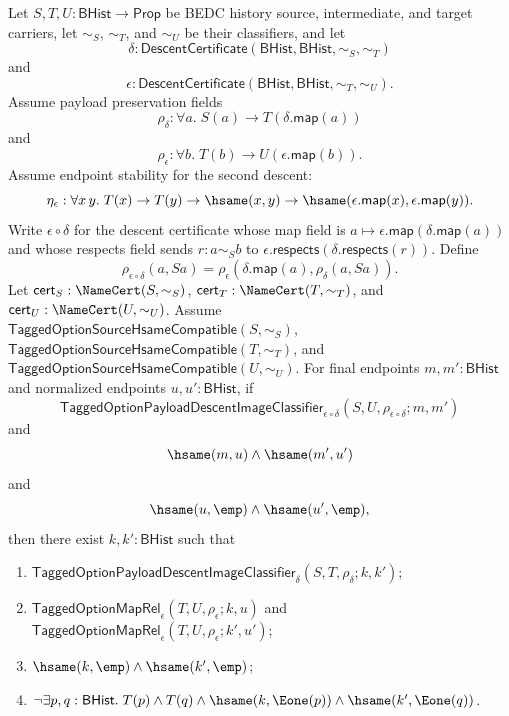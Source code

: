 \begin{theorem}
Let $S,T,U:\mathsf{BHist}\to\mathsf{Prop}$ be BEDC history source,
intermediate, and target carriers, let $\sim_S$, $\sim_T$, and $\sim_U$ be their
classifiers, and let
$$
\delta:\mathsf{DescentCertificate}(\mathsf{BHist},\mathsf{BHist},\sim_S,\sim_T)
$$
and
$$
\epsilon:\mathsf{DescentCertificate}(\mathsf{BHist},\mathsf{BHist},\sim_T,\sim_U).
$$
Assume payload preservation fields
$$
\rho_{\delta}:\forall a.\;S(a)\to T(\delta.\mathsf{map}(a))
$$
and
$$
\rho_{\epsilon}:\forall b.\;T(b)\to U(\epsilon.\mathsf{map}(b)).
$$
Assume endpoint stability for the second descent:
$$
\eta_{\epsilon}:\forall x\,y.\;
T(x)\to T(y)\to \hsame(x,y)\to
\hsame(\epsilon.\mathsf{map}(x),\epsilon.\mathsf{map}(y)).
$$
Write $\epsilon\circ\delta$ for the descent certificate whose map field is
$a\mapsto\epsilon.\mathsf{map}(\delta.\mathsf{map}(a))$ and whose respects field
sends $r:a\sim_S b$ to
$\epsilon.\mathsf{respects}(\delta.\mathsf{respects}(r))$. Define
$$
\rho_{\epsilon\circ\delta}(a,Sa)=
\rho_{\epsilon}(\delta.\mathsf{map}(a),\rho_{\delta}(a,Sa)).
$$
Let $\mathsf{cert}_S:\NameCert(S,\sim_S)$,
$\mathsf{cert}_T:\NameCert(T,\sim_T)$, and
$\mathsf{cert}_U:\NameCert(U,\sim_U)$. Assume
$\mathsf{TaggedOptionSourceHsameCompatible}(S,\sim_S)$,
$\mathsf{TaggedOptionSourceHsameCompatible}(T,\sim_T)$, and
$\mathsf{TaggedOptionSourceHsameCompatible}(U,\sim_U)$. For final endpoints
$m,m':\mathsf{BHist}$ and normalized endpoints $u,u':\mathsf{BHist}$, if
$$
\mathsf{TaggedOptionPayloadDescentImageClassifier}_{\epsilon\circ\delta}
(S,U,\rho_{\epsilon\circ\delta};m,m')
$$
and
$$
\hsame(m,u)\land \hsame(m',u')
$$
and
$$
\hsame(u,\emp)\land \hsame(u',\emp),
$$
then there exist $k,k':\mathsf{BHist}$ such that
\begin{enumerate}
\item $\mathsf{TaggedOptionPayloadDescentImageClassifier}_{\delta}
(S,T,\rho_{\delta};k,k')$;
\item $\mathsf{TaggedOptionMapRel}_{\epsilon}(T,U,\rho_{\epsilon};k,u)$ and
$\mathsf{TaggedOptionMapRel}_{\epsilon}(T,U,\rho_{\epsilon};k',u')$;
\item $\hsame(k,\emp)\land \hsame(k',\emp)$;
\item $\neg\exists p,q:\mathsf{BHist}.\;
T(p)\land T(q)\land
\hsame(k,\Eone(p))\land
\hsame(k',\Eone(q))$.
\end{enumerate}
\end{theorem}
